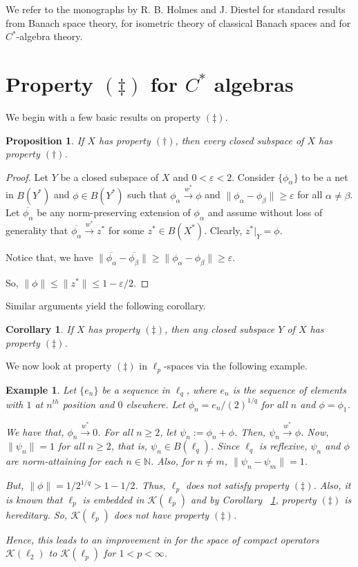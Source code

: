 \documentclass[11pt]{amsart}
\newcommand{\e}{\varepsilon}
\newcommand{\ol}{\overline}
\newcommand{\N}{\mathbb{N}}
\newcommand{\K}{\mathcal{K}}
\newtheorem{cor}[thm]{Corollary}
\newtheorem{ex}[thm]{Example}
\newtheorem{prop}[thm]{Proposition}
\begin{document}
We refer to the monographs by R. B. Holmes \cite{Ho} and J. Diestel \cite{Di} for standard results from Banach space theory, \cite{L} for isometric theory of classical Banach spaces and \cite{A1} for $C^\ast$-algebra theory.

\section{Property $(\ddag)$ for $C^\ast$ algebras}
We begin with a few basic results on property $(\ddag)$.

\begin{prop}
	If $X$ has property $(\dagger)$, then every closed subspace of $X$ has property $(\dagger)$.
\end{prop}

\begin{proof}
	Let $Y$ be a closed subspace of $X$ and $0 <\e <2$. Consider $\{\phi_\alpha\}$ to be a net in $B(Y^*)$ and $\phi \in B(Y^*)$ such that $\phi_\alpha \xrightarrow{w^*} \phi$ and $\|\phi_\alpha - \phi_\beta\| \geq \e$ for all $\alpha \neq \beta$. Let $\ol{\phi_\alpha}$ be any norm-preserving extension of $\phi_\alpha$ and assume without loss of generality that $\ol{\phi_\alpha} \xrightarrow{w^*} z^*$ for some $z^* \in B(X^*)$. Clearly, $z^*|_Y=\phi$.
	
	Notice that, we have $\| \ol{\phi_\alpha}-\ol{\phi_\beta}\| \geq \|\phi_\alpha - \phi_\beta\| \geq \e$.
	
	So, $\|\phi\| \leq \|z^*\| \leq 1-\e/2$.
\end{proof}

Similar arguments yield the following corollary.

\begin{cor} \label{corhereddag}
	If $X$ has property $(\ddag)$, then any closed subspace $Y$ of $X$ has property $(\ddag)$.
\end{cor}

We now look at property $(\ddag)$ in $\ell_p$-spaces via the following example.

\begin{ex}
Let $\{e_n\}$ be a sequence in $\ell_q$, where $e_n$ is the sequence of elements with $1$ at $n^{th}$ position and $0$ elsewhere. Let $\phi_n=e_n/(2)^{1/q}$ for all $n$ and $\phi=\phi_1$.
	
We have that, $\phi_n \xrightarrow{w^\ast} 0$. For all $n \geq 2$, let $\psi_n:=\phi_n + \phi$. Then, $\psi_n\xrightarrow{w^\ast} \phi$. Now, $\|\psi_n\|=1$ for all $n \geq 2$, that is, $\psi_n \in B(\ell_q)$. Since $\ell_q$ is reflexive, $\psi_n$ and $\phi$ are norm-attaining for each $n \in \N$. Also, for $n \neq m$, $\|\psi_n-\psi_m\|=1$.
	
But, $\|\phi\|=1/2^{1/q} >1 - 1/2$. Thus, $\ell_p$ does not satisfy property $(\ddagger)$. Also, it is known that $\ell_p$ is embedded in $\K(\ell_p)$ and by Corollary ~\ref{corhereddag}, property $(\ddag)$ is hereditary. So, $\K(\ell_p)$ does not have property $(\ddag)$.

Hence, this leads to an improvement in \cite[Theorem 5]{LM} for the space of compact operators $\K(\ell_2)$ to $\K(\ell_p)$ for $1 <p <\infty$.
\end{ex}
\end{document}
